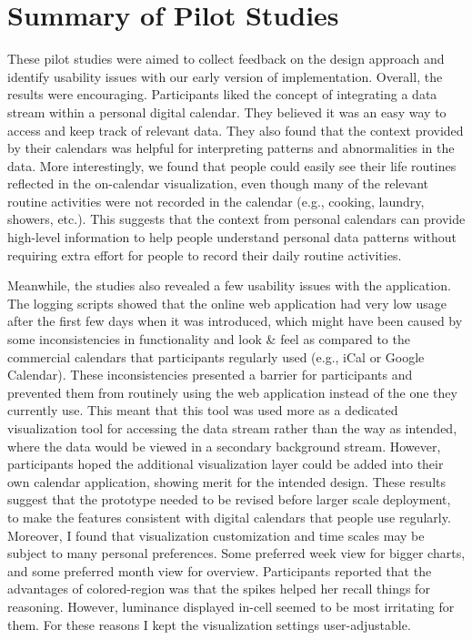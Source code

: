 \documentclass[12pt,oneside]{book}
\begin{document}
\section{Summary of Pilot Studies}
These pilot studies were aimed to collect feedback on the design approach and identify usability issues with our early version of implementation. Overall, the results were encouraging. Participants liked the concept of integrating a data stream within a personal digital calendar. They believed it was an easy way to access and keep track of relevant data. They also found that the context provided by their calendars was helpful for interpreting patterns and abnormalities in the data. More interestingly, we found that people could easily see their life routines reflected in the on-calendar visualization, even though many of the relevant routine activities were not recorded in the calendar (e.g., cooking, laundry, showers, etc.). This suggests that the context from personal calendars can provide high-level information to help people understand personal data patterns without requiring extra effort for people to record their daily routine activities.

Meanwhile, the studies also revealed a few usability issues with the application. The logging scripts showed that the online web application had very low usage after the first few days when it was introduced, which might have been caused by some inconsistencies in functionality and look \& feel as compared to the commercial calendars that participants regularly used (e.g., iCal or Google Calendar). These inconsistencies presented a barrier for participants and prevented them from routinely using the web application instead of the one they currently use. This meant that this tool was used more as a dedicated visualization tool for accessing the data stream rather than the way as intended, where the data would be viewed in a secondary background stream. However, participants hoped the additional visualization layer could be added into their own calendar application, showing merit for the intended design. These results suggest that the prototype needed to be revised before larger scale deployment, to make the features consistent with digital calendars that people use regularly.
Moreover, I found that visualization customization and time scales may be subject to many personal preferences. Some preferred week view for bigger charts, and some preferred month view for overview. Participants reported that the advantages of colored-region was that the spikes helped her recall things for reasoning. However, luminance displayed in-cell seemed to be most irritating for them. For these reasons I kept the visualization settings user-adjustable.
\end{document}
